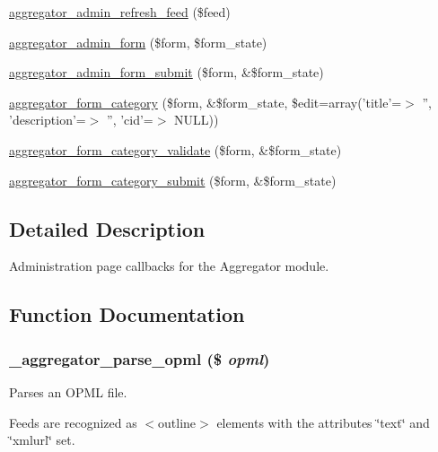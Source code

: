 \begin{DoxyCompactItemize}
\hyperlink{aggregator_8admin_8inc_aeb33d62d98fcdc9c66379002613f497b}{aggregator\_\-admin\_\-refresh\_\-feed} (\$feed)
\item 
\hyperlink{group__forms_gaf74e45e5f77c20f8e8483e13aea0d25c}{aggregator\_\-admin\_\-form} (\$form, \$form\_\-state)
\item 
\hyperlink{aggregator_8admin_8inc_a9cabb7efcb8d2475b259921beffc8776}{aggregator\_\-admin\_\-form\_\-submit} (\$form, \&\$form\_\-state)
\item 
\hyperlink{group__forms_gaf977e902973833a5a8fe5431ba5b829d}{aggregator\_\-form\_\-category} (\$form, \&\$form\_\-state, \$edit=array('title'=$>$ '', 'description'=$>$ '', 'cid'=$>$ NULL))
\item 
\hyperlink{aggregator_8admin_8inc_a419c55e35895dea1f41d5b31908883d5}{aggregator\_\-form\_\-category\_\-validate} (\$form, \&\$form\_\-state)
\item 
\hyperlink{aggregator_8admin_8inc_a56c1cadf416d17bd8dd8a53cc6ed5aeb}{aggregator\_\-form\_\-category\_\-submit} (\$form, \&\$form\_\-state)
\end{DoxyCompactItemize}


\subsection{Detailed Description}
Administration page callbacks for the Aggregator module. 

\subsection{Function Documentation}
\hypertarget{aggregator_8admin_8inc_a96380c072c48c71f9b71574600be61d3}{
\subsubsection[{\_\-aggregator\_\-parse\_\-opml}]{\setlength{\rightskip}{0pt plus 5cm}\_\-aggregator\_\-parse\_\-opml (\$ {\em opml})}}
\label{aggregator_8admin_8inc_a96380c072c48c71f9b71574600be61d3}
Parses an OPML file.

Feeds are recognized as $<$outline$>$ elements with the attributes \char`\"{}text\char`\"{} and \char`\"{}xmlurl\char`\"{} set.


